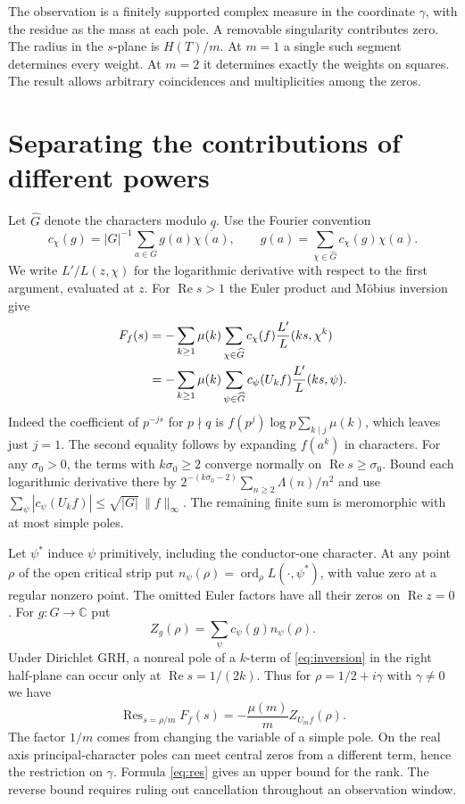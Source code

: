 \documentclass[11pt,letterpaper]{article}
\newcommand{\C}{\mathbb C}\newcommand{\R}{\mathbb R}\newcommand{\Z}{\mathbb Z}
\newcommand{\Res}{\operatorname{Res}}\newcommand{\supp}{\operatorname{supp}}
\newcommand{\ord}{\operatorname{ord}}\newcommand{\imag}{\operatorname{Im}}
\newcommand{\re}{\operatorname{Re}}\newcommand{\e}{\mathrm e}\newcommand{\dd}{\,\mathrm d}
\begin{document}
The observation is a finitely supported complex measure in the coordinate $\gamma$, with the residue as the mass at each pole. A removable singularity contributes zero. The radius in the $s$-plane is $H(T)/m$. At $m=1$ a single such segment determines every weight. At $m=2$ it determines exactly the weights on squares. The result allows arbitrary coincidences and multiplicities among the zeros.

\section{Separating the contributions of different powers}
Let $\widehat G$ denote the characters modulo $q$. Use the Fourier convention
\[
 c_\chi(g)=|G|^{-1}\sum_{a\in G}g(a)\overline{\chi(a)},\qquad
 g(a)=\sum_{\chi\in\widehat G} c_\chi(g)\chi(a).
\]
We write $L'/L(z,\chi)$ for the logarithmic derivative with respect to the first argument, evaluated at $z$. For $\re s>1$ the Euler product and M\"obius inversion give
\begin{align}
 F_f(s)
 &=-\sum_{k\ge1}\mu(k)\sum_{\chi\in\widehat G}
        c_\chi(f)\frac{L'}{L}(ks,\chi^k)\notag\\
 &=-\sum_{k\ge1}\mu(k)\sum_{\psi\in\widehat G}
        c_\psi(U_k f)\frac{L'}{L}(ks,\psi).
 \label{eq:inversion}
\end{align}
Indeed the coefficient of $p^{-js}$ for $p\nmid q$ is
$f(p^j)\log p\sum_{k\mid j}\mu(k)$, which leaves just $j=1$. The second equality follows by expanding $f(a^k)$ in characters. For any $\sigma_0>0$, the terms with $k\sigma_0\ge 2$ converge normally on $\re s\ge\sigma_0$. Bound each logarithmic derivative there by
$2^{-(k\sigma_0-2)}\sum_{n\ge2}\Lambda(n)/n^2$ and use
$\sum_\psi |c_\psi(U_kf)|\le\sqrt{|G|}\,\|f\|_\infty$.
The remaining finite sum is meromorphic with at most simple poles.

Let $\psi^*$ induce $\psi$ primitively, including the conductor-one character. At any point $\rho$ of the open critical strip put $n_\psi(\rho)=\ord_\rho L(\cdot,\psi^*)$, with value zero at a regular nonzero point. The omitted Euler factors have all their zeros on $\re z=0$. For $g:G\to\C$ put
\[
  Z_g(\rho)=\sum_\psi c_\psi(g)n_\psi(\rho).
\]
Under Dirichlet GRH, a nonreal pole of a $k$-term of \eqref{eq:inversion} in the right half-plane can occur only at $\re s=1/(2k)$. Thus for $\rho=1/2+i\gamma$ with $\gamma\ne0$ we have
\begin{equation}
 \Res_{s=\rho/m}F_f(s)=-\frac{\mu(m)}{m}Z_{U_m f}(\rho).
 \label{eq:res}
\end{equation}
The factor $1/m$ comes from changing the variable of a simple pole. On the real axis principal-character poles can meet central zeros from a different term, hence the restriction on $\gamma$. Formula \eqref{eq:res} gives an upper bound for the rank. The reverse bound requires ruling out cancellation throughout an observation window.
\end{document}
